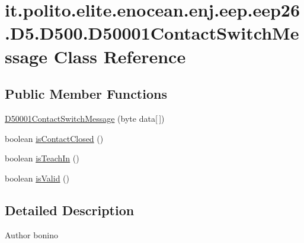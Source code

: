 \hypertarget{classit_1_1polito_1_1elite_1_1enocean_1_1enj_1_1eep_1_1eep26_1_1_d5_1_1_d500_1_1_d50001_contact_switch_message}{}\section{it.\+polito.\+elite.\+enocean.\+enj.\+eep.\+eep26.\+D5.\+D500.\+D50001\+Contact\+Switch\+Message Class Reference}
\label{classit_1_1polito_1_1elite_1_1enocean_1_1enj_1_1eep_1_1eep26_1_1_d5_1_1_d500_1_1_d50001_contact_switch_message}
\subsection*{Public Member Functions}
\begin{DoxyCompactItemize}
\item 
\hyperlink{classit_1_1polito_1_1elite_1_1enocean_1_1enj_1_1eep_1_1eep26_1_1_d5_1_1_d500_1_1_d50001_contact_switch_message_afa21488b6a7bee7d80387caea4d943d6}{D50001\+Contact\+Switch\+Message} (byte data\mbox{[}$\,$\mbox{]})
\item 
boolean \hyperlink{classit_1_1polito_1_1elite_1_1enocean_1_1enj_1_1eep_1_1eep26_1_1_d5_1_1_d500_1_1_d50001_contact_switch_message_a7ca178e9a673f6341fd16060a579b423}{is\+Contact\+Closed} ()
\item 
boolean \hyperlink{classit_1_1polito_1_1elite_1_1enocean_1_1enj_1_1eep_1_1eep26_1_1_d5_1_1_d500_1_1_d50001_contact_switch_message_af1dbd20253632e7b6f388f905ce0a791}{is\+Teach\+In} ()
\item 
boolean \hyperlink{classit_1_1polito_1_1elite_1_1enocean_1_1enj_1_1eep_1_1eep26_1_1_d5_1_1_d500_1_1_d50001_contact_switch_message_abe9d0ca0dd36f123243baeebeff5ec7d}{is\+Valid} ()
\end{DoxyCompactItemize}


\subsection{Detailed Description}
\begin{DoxyAuthor}{Author}
bonino 
\end{DoxyAuthor}


